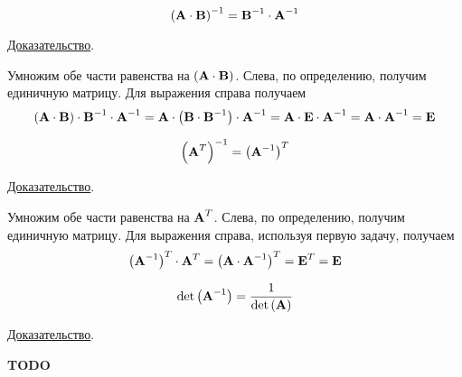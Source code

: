 \documentclass[../../calc-math-exam-2023.tex]{subfiles}
\begin{document}
    \begin{theorem}
        \begin{equation*}
            \left( \bf{A} \cdot \bf{B} \right)^{-1} = \bf{B}^{-1} \cdot \bf{A}^{-1}
        \end{equation*}

        \underline{Доказательство}.
        \vspace{5pt}

        Умножим обе части равенства на $\left( \bf{A} \cdot \bf{B} \right)$. Слева, по определению,
        получим единичную матрицу. Для выражения справа получаем
        \begin{equation*}
            \left( \bf{A} \cdot \bf{B} \right) \cdot \bf{B}^{-1} \cdot \bf{A}^{-1} = \bf{A} \cdot \left( \bf{B} \cdot \bf{B}^{-1} \right) \cdot \bf{A}^{-1} =
            \bf{A} \cdot \bf{E} \cdot \bf{A}^{-1} = \bf{A} \cdot \bf{A}^{-1} = \bf{E}
        \end{equation*}
    \end{theorem}

    \begin{theorem}
        \begin{equation*}
            \left( \bf{A}^T \right)^{-1} = \left( \bf{A}^{-1} \right)^T
        \end{equation*}

        \underline{Доказательство}.
        \vspace{5pt}

        Умножим обе части равенства на $\displaystyle \bf{A}^T$. Слева, по определению,
        получим единичную матрицу. Для выражения справа, используя первую задачу, получаем
        \begin{equation*}
            \left( \bf{A}^{-1} \right)^T \cdot \bf{A}^T = \left( \bf{A} \cdot \bf{A}^{-1} \right)^T = \bf{E}^T = \bf{E}
        \end{equation*}
    \end{theorem}

    \begin{theorem}
        \begin{equation*}
            \det \left( \bf{A}^{-1} \right) = \frac{1}{\det\left( \bf{A} \right)}
        \end{equation*}

        \underline{Доказательство}.
        \vspace{5pt}

        \bf{TODO}
    \end{theorem}
\end{document}
